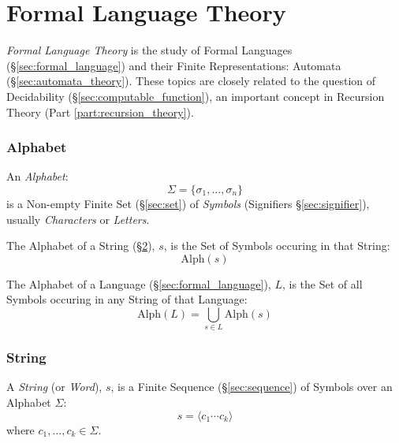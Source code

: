 \part{Formal Language Theory}\label{part:formal_language}
\cite{hammel03}

\emph{Formal Language Theory} is the study of Formal Languages
(\S\ref{sec:formal_language}) and their Finite Representations: Automata
(\S\ref{sec:automata_theory}). These topics are closely related to the question
of Decidability (\S\ref{sec:computable_function}), an important concept in
Recursion Theory (Part \ref{part:recursion_theory}).



\section{Alphabet}\label{sec:alphabet}

An \emph{Alphabet}:
\[
  \Sigma = \{ \sigma_1, \ldots, \sigma_n \}
\]
is a Non-empty Finite Set (\S\ref{sec:set}) of \emph{Symbols} (Signifiers
\S\ref{sec:signifier}), usually \emph{Characters} or \emph{Letters}.

The Alphabet of a String (\S\ref{sec:string}), $s$, is the Set of Symbols
occuring in that String:
\[
  \mathrm{Alph}(s)
\]

The Alphabet of a Language (\S\ref{sec:formal_language}), $L$, is the Set of all
Symbols occuring in any String of that Language:
\[
  \mathrm{Alph}(L) = \bigcup_{s \in L} \mathrm{Alph}(s)
\]



\section{String}\label{sec:string}

A \emph{String} (or \emph{Word}), $s$, is a Finite Sequence
(\S\ref{sec:sequence}) of Symbols over an Alphabet $\Sigma$:
\[
  s = \langle c_1 \cdots c_k \rangle
\]
where $c_1, \ldots, c_k \in \Sigma$.

